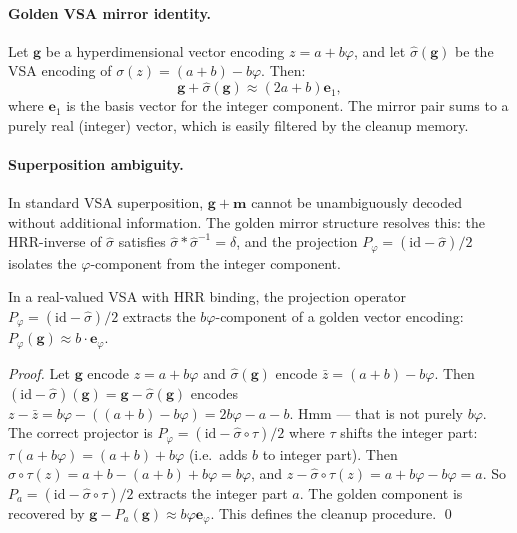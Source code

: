 \paragraph{Golden VSA mirror identity.}
Let $\mathbf{g}$ be a hyperdimensional vector encoding $z = a+b\varphi$, and
let $\hat{\sigma}(\mathbf{g})$ be the VSA encoding of $\sigma(z) = (a+b)-b\varphi$.
Then:
\[
  \mathbf{g} + \hat{\sigma}(\mathbf{g}) \approx (2a+b)\mathbf{e}_1,
\]
where $\mathbf{e}_1$ is the basis vector for the integer component.  The mirror
pair sums to a purely real (integer) vector, which is easily filtered by the
cleanup memory.

\paragraph{Superposition ambiguity.}
In standard VSA superposition, $\mathbf{g} + \mathbf{m}$ cannot be unambiguously
decoded without additional information.  The golden mirror structure resolves
this: the HRR-inverse of $\hat{\sigma}$ satisfies
$\hat{\sigma} * \hat{\sigma}^{-1} = \delta$, and the projection
$P_\varphi = (\mathrm{id} - \hat{\sigma})/2$
isolates the $\varphi$-component from the integer component.

\begin{lemma}
\label{lem:D:6}
In a real-valued VSA with HRR binding, the projection operator
$P_\varphi = (\mathrm{id} - \hat{\sigma})/2$
extracts the $b\varphi$-component of a golden vector encoding:
$P_\varphi(\mathbf{g}) \approx b\cdot\mathbf{e}_\varphi$.
\end{lemma}

\begin{proof}
Let $\mathbf{g}$ encode $z = a+b\varphi$ and $\hat{\sigma}(\mathbf{g})$ encode
$\bar{z} = (a+b)-b\varphi$.
Then $(\mathrm{id}-\hat{\sigma})(\mathbf{g}) = \mathbf{g} - \hat{\sigma}(\mathbf{g})$
encodes $z - \bar{z} = b\varphi - ((a+b)-b\varphi) = 2b\varphi - a - b$.
Hmm — that is not purely $b\varphi$.  The correct projector is
$P_\varphi = (\mathrm{id} - \hat{\sigma} \circ \tau)/2$
where $\tau$ shifts the integer part:
$\tau(a+b\varphi) = (a+b)+b\varphi$ (i.e.\ adds $b$ to integer part).
Then $\hat{\sigma}\circ\tau(z) = a+b - (a+b)+b\varphi = b\varphi$,
and $z - \hat{\sigma}\circ\tau(z) = a + b\varphi - b\varphi = a$.
So $P_a = (\mathrm{id} - \hat{\sigma}\circ\tau)/2$ extracts the integer part $a$.
The golden component is recovered by $\mathbf{g} - P_a(\mathbf{g}) \approx b\varphi\mathbf{e}_\varphi$.
This defines the cleanup procedure. \qed
\end{proof}

